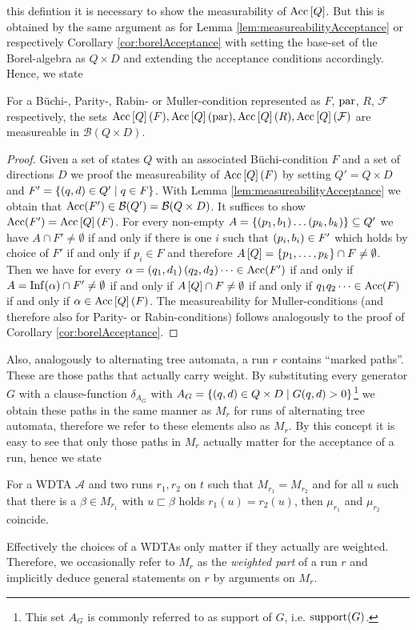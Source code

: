 this defintion it is necessary to show the measurability of $\operatorname{Acc}\left[Q\right]$. 
But this is obtained by the same argument as for Lemma 
\ref{lem:measureabilityAcceptance} or respectively Corollary 
\ref{cor:borelAcceptance} with setting the base-set of the Borel-algebra as
$Q\times D$ and extending the acceptance conditions accordingly. Hence, we 
state
\begin{lemma}
  For a Büchi-, Parity-, Rabin- or Muller-condition represented as $F$, 
  $\operatorname{par}$, $R$, $\mathcal{F}$ respectively, the sets $\operatorname{Acc}\left[Q\right](F),
  \operatorname{Acc}\left[Q\right](\operatorname{par}),\operatorname{Acc}\left[Q\right](R),\operatorname{Acc}\left[Q\right](\mathcal{F})$
  are measureable in $\mathcal{B}(Q\times D)$.
  \label{lem:treeBorelAcceptance}
\end{lemma}
\begin{proof}
  Given a set of states $Q$ with an associated Büchi-condition $F$ and a set of 
  directions $D$ we proof the measureability of $\operatorname{Acc}\left[Q\right](F)$ by 
  setting $Q' = Q\times D$ and $F' = \left\{\left(q, d\right)\in Q'\mid q\in F\right\}$. With
  Lemma \ref{lem:measureabilityAcceptance} we obtain that 
  $\operatorname{Acc}(F')\in\mathcal{B}(Q') = \mathcal{B}(Q\times D)$. It suffices to show
  $\operatorname{Acc}(F') = \operatorname{Acc}\left[Q\right](F)$. For every non-empty
  $A = \left\{\left(p_{1},b_{1}\right)\dots\left(p_{k},b_{k}\right)\right\}\subseteq Q'$ we have
  $A\cap F'\neq\emptyset$ if and only if there is one $i$ such that 
  $\left(p_{i},b_{i}\right)\in F'$ which holds by choice of $F'$ if and only if
  $p_{i}\in F$ and therefore 
  $A\left[Q\right] = \left\{p_{1},\dots,p_{k}\right\}\cap F\neq\emptyset$. Then we have
  for every $\alpha = \left(q_{1},d_{1}\right)\left(q_{2},d_{2}\right)\dots\in\operatorname{Acc}(F')$ 
  if and only if $A = \operatorname{Inf}(\alpha)\cap F'\neq\emptyset$ if and only if 
  $A\left[Q\right]\cap F\neq\emptyset$ if and only if $q_{1}q_{2}\dots\in\operatorname{Acc}(F)$
  if and only if $\alpha\in\operatorname{Acc}\left[Q\right](F)$. The measureability for 
  Muller-conditions (and therefore also for Parity- or Rabin-conditions) 
  follows analogously to the proof of Corollary \ref{cor:borelAcceptance}.
\end{proof}
Also, analogously to alternating tree automata, a run $r$ contains 
\enquote{marked paths}. These are those paths that actually carry weight. By
substituting every generator $G$ with a clause-function $\delta_{A_{G}}$ with
$A_{G} = \left\{\left(q,d\right)\in Q\times D\mid G(q,d)>0\right\}$\footnote{This set $A_{G}$
is commonly referred to as support of $G$, i.e. $\operatorname{support}(G)$.
} we obtain these paths in the same manner as $M_{r}$ for runs of alternating
tree automata, therefore we refer to these elements also as $M_{r}$. By this 
concept it is easy to see that only those paths in $M_{r}$ actually matter for
the acceptance of a run, hence we state
\begin{lemma}
  For a \ac{WDTA} $\mathcal{A}$ and two runs $r_{1}, r_{2}$ on $t$ such that
  $M_{r_{1}} = M_{r_{2}}$ and for all $u$ such that there is a 
  $\beta\in M_{r_{1}}$ with $u\sqsubset\beta$ holds $r_{1}(u) = r_{2}(u)$, then
  $\mu_{r_{1}}$ and $\mu_{r_{2}}$ coincide.
\end{lemma}
Effectively the choices of a \acp{WDTA} only matter if they actually are 
weighted. Therefore, we occasionally refer to $M_{r}$ as the 
\emph{weighted part} of a run $r$ and implicitly deduce general statements on
$r$ by arguments on $M_{r}$.

